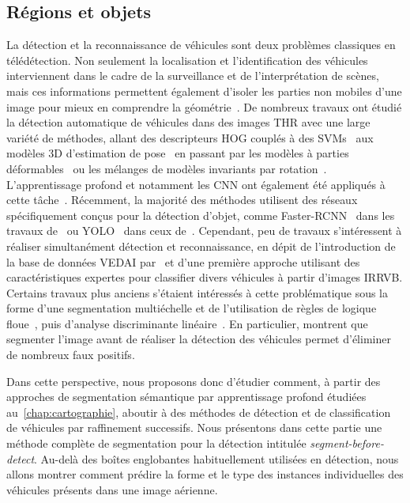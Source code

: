 \subsection{Régions et objets}

La détection et la reconnaissance de véhicules sont deux problèmes classiques en télédétection. Non seulement la localisation et l'identification des véhicules interviennent dans le cadre de la surveillance et de l'interprétation de scènes, mais ces informations permettent également d'isoler les parties non mobiles d'une image pour mieux en comprendre la géométrie~\cite{leberl_recognizing_2007}. De nombreux travaux ont étudié la détection automatique de véhicules dans des images \gls{THR} avec une large variété de méthodes, allant des descripteurs \gls{HOG} couplés à des \glspl{SVM}~\cite{michel_local_2011,gleason_vehicle_2011,kamenetsky_aerial_2015} aux modèles 3D d'estimation de pose~\cite{janney_pose-invariant_2015} en passant par les modèles à parties déformables~\cite{randrianarivo_urban_2013} ou les mélanges de modèles invariants par rotation~\cite{randrianarivo_contextual_2016}. L'apprentissage profond et notamment les \gls{CNN} ont également été appliqués à cette tâche~\cite{chen_vehicle_2014}. Récemment, la majorité des méthodes utilisent des réseaux spécifiquement conçus pour la détection d'objet, comme Faster-RCNN~\cite{ren_faster_2017} dans les travaux de~\citet{sommer_fast_2017} ou YOLO~\cite{redmon_you_2016} dans ceux de~\citet{van_etten_you_2018}. Cependant, peu de travaux s'intéressent à réaliser simultanément détection et reconnaissance, en dépit de l'introduction de la base de données \gls{VEDAI} par~\citet{razakarivony_vehicle_2016} et d'une première approche utilisant des caractéristiques expertes pour classifier divers véhicules à partir d'images \gls{IRRVB}. Certains travaux plus anciens s'étaient intéressés à cette problématique sous la forme d'une segmentation multiéchelle et de l'utilisation de règles de logique floue~\cite{holt_object-based_2009}, puis d'analyse discriminante linéaire~\cite{eikvil_classification-based_2009}. En particulier, \citet{eikvil_classification-based_2009} montrent que segmenter l'image avant de réaliser la détection des véhicules permet d'éliminer de nombreux faux positifs.

Dans cette perspective, nous proposons donc d'étudier comment, à partir des approches de segmentation sémantique par apprentissage profond étudiées au~\cref{chap:cartographie}, aboutir à des méthodes de détection et de classification de véhicules par raffinement successifs. Nous présentons dans cette partie une méthode complète de segmentation pour la détection intitulée \emph{segment-before-detect}. Au-delà des boîtes englobantes habituellement utilisées en détection, nous allons montrer comment prédire la forme et le type des instances individuelles des véhicules présents dans une image aérienne.

